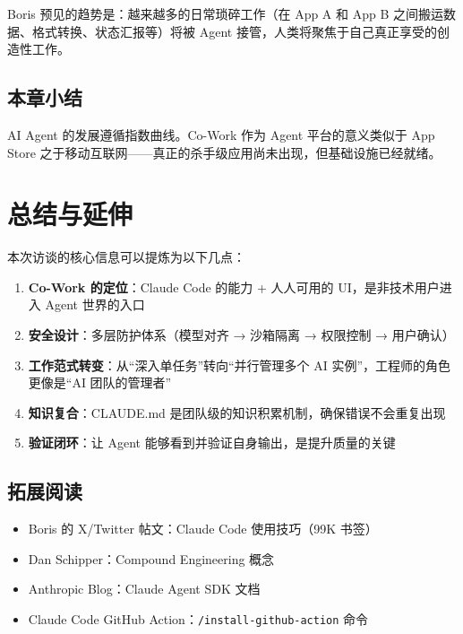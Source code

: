 \documentclass[a4paper]{article}
\begin{document}
Boris 预见的趋势是：越来越多的日常琐碎工作（在 App A 和 App B 之间搬运数据、格式转换、状态汇报等）将被 Agent 接管，人类将聚焦于自己真正享受的创造性工作。

\subsection{本章小结}

AI Agent 的发展遵循指数曲线。Co-Work 作为 Agent 平台的意义类似于 App Store 之于移动互联网——真正的杀手级应用尚未出现，但基础设施已经就绪。

\section{总结与延伸}

本次访谈的核心信息可以提炼为以下几点：

\begin{enumerate}
    \item \textbf{Co-Work 的定位}：Claude Code 的能力 + 人人可用的 UI，是非技术用户进入 Agent 世界的入口
    \item \textbf{安全设计}：多层防护体系（模型对齐 → 沙箱隔离 → 权限控制 → 用户确认）
    \item \textbf{工作范式转变}：从``深入单任务''转向``并行管理多个 AI 实例''，工程师的角色更像是``AI 团队的管理者''
    \item \textbf{知识复合}：CLAUDE.md 是团队级的知识积累机制，确保错误不会重复出现
    \item \textbf{验证闭环}：让 Agent 能够看到并验证自身输出，是提升质量的关键
\end{enumerate}

\subsection{拓展阅读}

\begin{itemize}
    \item Boris 的 X/Twitter 帖文：Claude Code 使用技巧（99K 书签）
    \item Dan Schipper：Compound Engineering 概念
    \item Anthropic Blog：Claude Agent SDK 文档
    \item Claude Code GitHub Action：\texttt{/install-github-action} 命令
\end{itemize}

\end{document}
